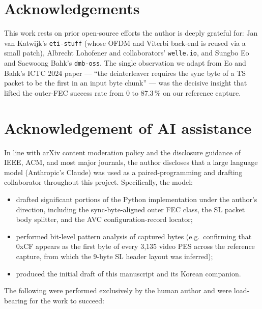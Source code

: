 \documentclass[11pt,a4paper]{article}
\begin{document}
\section*{Acknowledgements}
This work rests on prior open-source efforts the author is deeply
grateful for: Jan van Katwijk's \texttt{eti-stuff} (whose OFDM and
Viterbi back-end is reused via a small patch), Albrecht Lohofener
and collaborators' \texttt{welle.io}, and Sungbo Eo and Saewoong
Bahk's \texttt{dmb-oss}.  The single observation we adapt from
Eo and Bahk's ICTC 2024 paper --- ``the deinterleaver requires the
sync byte of a TS packet to be the first in an input byte chunk''
--- was the decisive insight that lifted the outer-FEC success
rate from 0 to 87.3\,\% on our reference capture.

\section*{Acknowledgement of AI assistance}
In line with arXiv content moderation policy and the disclosure
guidance of IEEE, ACM, and most major journals, the author
discloses that a large language model (Anthropic's Claude) was
used as a paired-programming and drafting collaborator throughout
this project.  Specifically, the model:
\begin{itemize}[leftmargin=*,nosep]
\item drafted significant portions of the Python implementation
      under the author's direction, including the
      sync-byte-aligned outer FEC class, the SL packet body
      splitter, and the AVC configuration-record locator;
\item performed bit-level pattern analysis of captured bytes
      (e.g.\ confirming that 0xCF appears as the first byte of
      every 3{,}135 video PES across the reference capture, from
      which the 9-byte SL header layout was inferred);
\item produced the initial draft of this manuscript and its
      Korean companion.
\end{itemize}
The following were performed exclusively by the human author and
were load-bearing for the work to succeed:
\end{document}
